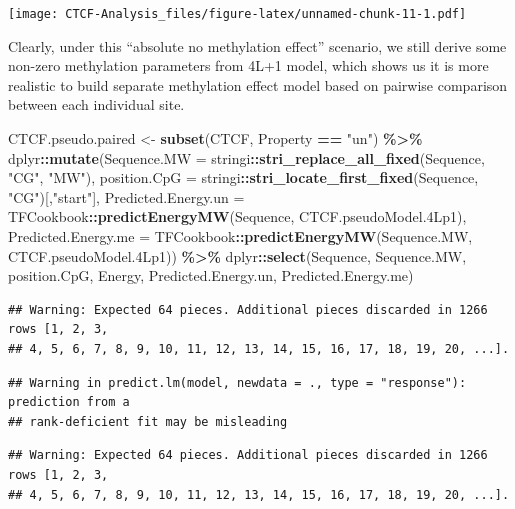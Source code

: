 \documentclass[
]{article}
\newenvironment{Shaded}{\begin{snugshade}}{\end{snugshade}}
\newcommand{\DataTypeTok}[1]{\textcolor[rgb]{0.13,0.29,0.53}{#1}}
\newcommand{\FloatTok}[1]{\textcolor[rgb]{0.00,0.00,0.81}{#1}}
\newcommand{\KeywordTok}[1]{\textcolor[rgb]{0.13,0.29,0.53}{\textbf{#1}}}
\newcommand{\NormalTok}[1]{#1}
\newcommand{\OperatorTok}[1]{\textcolor[rgb]{0.81,0.36,0.00}{\textbf{#1}}}
\newcommand{\StringTok}[1]{\textcolor[rgb]{0.31,0.60,0.02}{#1}}
\begin{document}
\texttt{[image: CTCF-Analysis\_files/figure-latex/unnamed-chunk-11-1.pdf]}

Clearly, under this ``absolute no methylation effect'' scenario, we
still derive some non-zero methylation parameters from 4L+1 model, which
shows us it is more realistic to build separate methylation effect model
based on pairwise comparison between each individual site.

\begin{Shaded}
\begin{Highlighting}[]
\NormalTok{CTCF.pseudo.paired \textless{}{-}}\StringTok{ }\KeywordTok{subset}\NormalTok{(CTCF, Property }\OperatorTok{==}\StringTok{ "un"}\NormalTok{) }\OperatorTok{\%\textgreater{}\%}
\StringTok{  }\NormalTok{dplyr}\OperatorTok{::}\KeywordTok{mutate}\NormalTok{(}\DataTypeTok{Sequence.MW =}\NormalTok{ stringi}\OperatorTok{::}\KeywordTok{stri\_replace\_all\_fixed}\NormalTok{(Sequence, }\StringTok{"CG"}\NormalTok{, }\StringTok{"MW"}\NormalTok{),}
                \DataTypeTok{position.CpG =}\NormalTok{ stringi}\OperatorTok{::}\KeywordTok{stri\_locate\_first\_fixed}\NormalTok{(Sequence, }\StringTok{"CG"}\NormalTok{)[,}\StringTok{"start"}\NormalTok{],}
                \DataTypeTok{Predicted.Energy.un =}\NormalTok{ TFCookbook}\OperatorTok{::}\KeywordTok{predictEnergyMW}\NormalTok{(Sequence, CTCF.pseudoModel}\FloatTok{.4}\NormalTok{Lp1),}
                \DataTypeTok{Predicted.Energy.me =}\NormalTok{ TFCookbook}\OperatorTok{::}\KeywordTok{predictEnergyMW}\NormalTok{(Sequence.MW, CTCF.pseudoModel}\FloatTok{.4}\NormalTok{Lp1)) }\OperatorTok{\%\textgreater{}\%}
\StringTok{  }\NormalTok{dplyr}\OperatorTok{::}\KeywordTok{select}\NormalTok{(Sequence, Sequence.MW, position.CpG, Energy, Predicted.Energy.un, Predicted.Energy.me)}
\end{Highlighting}
\end{Shaded}

\begin{verbatim}
## Warning: Expected 64 pieces. Additional pieces discarded in 1266 rows [1, 2, 3,
## 4, 5, 6, 7, 8, 9, 10, 11, 12, 13, 14, 15, 16, 17, 18, 19, 20, ...].
\end{verbatim}

\begin{verbatim}
## Warning in predict.lm(model, newdata = ., type = "response"): prediction from a
## rank-deficient fit may be misleading
\end{verbatim}

\begin{verbatim}
## Warning: Expected 64 pieces. Additional pieces discarded in 1266 rows [1, 2, 3,
## 4, 5, 6, 7, 8, 9, 10, 11, 12, 13, 14, 15, 16, 17, 18, 19, 20, ...].
\end{verbatim}
\end{document}

